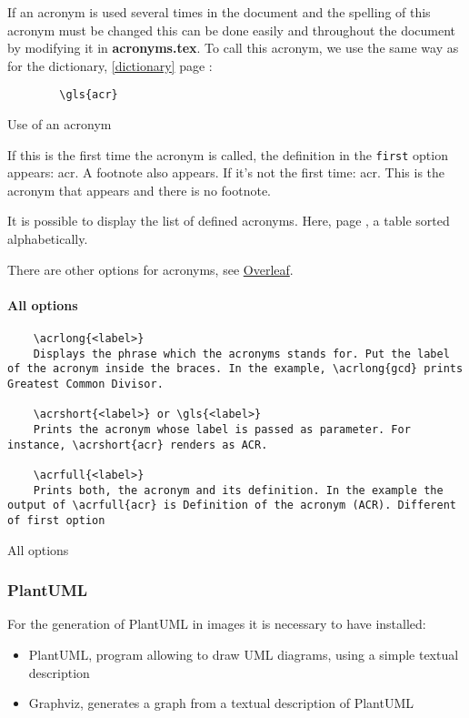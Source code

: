 If an acronym is used several times in the document and the spelling of this acronym must be changed
this can be done easily and throughout the document by modifying it in \textbf{acronyms.tex}.
To call this acronym, we use the same way as for the dictionary, \ref{dictionary} page
\pageref{dictionary} :
\begin{code}
    \begin{verbatim}
        \gls{acr}
\end{verbatim}
    \caption{Use of an acronym}
\end{code}

If this is the first time the acronym is called, the definition in the \texttt{first}
option appears: \gls{acr}.
A footnote also appears. \newline
If it's not the first time: \gls{acr}. This is the acronym that appears and there is no footnote.
\newline

It is possible to display the list of defined acronyms. Here, page \pageref{acronyms}, a table
sorted alphabetically.

There are other options for acronyms, see
\href{https://fr.overleaf.com/learn/latex/Glossaries}{Overleaf}.

\paragraph{All options}

\begin{code}
    \begin{verbatim}
    \acrlong{<label>}
    Displays the phrase which the acronyms stands for. Put the label of the acronym inside the braces. In the example, \acrlong{gcd} prints Greatest Common Divisor.

    \acrshort{<label>} or \gls{<label>}
    Prints the acronym whose label is passed as parameter. For instance, \acrshort{acr} renders as ACR.

    \acrfull{<label>}
    Prints both, the acronym and its definition. In the example the output of \acrfull{acr} is Definition of the acronym (ACR). Different of first option
    \end{verbatim}
    \caption{All options}
\end{code}

\subsubsection{PlantUML} \label{plamtuml}
For the generation of PlantUML in images it is necessary to have installed:
\begin{itemize}
    \item PlantUML, program allowing to draw UML diagrams, using a simple textual description
    \item Graphviz, generates a graph from a textual description of PlantUML
\end{itemize}

